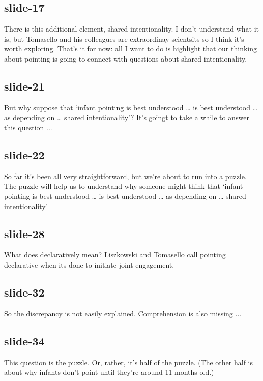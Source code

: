 \documentclass[12pt,\papersize]{extarticle}
\begin{document}
 
\subsection{slide-17}
There is this additional element, shared intentionality. I don't understand what it is, but Tomasello and his colleagues are extraordinay scientsits so I think it's worth exploring.
That's it for now: all I want to do is highlight that our thinking about pointing is going to connect with questions about shared intentionality.
 
 
\subsection{slide-21}
But why suppose that ‘infant pointing is best understood … is best understood … as depending on … shared intentionality’?
It's goingt to take a while to answer this question ...
 
 
\subsection{slide-22}
So far it's been all very straightforward, but we're about to run into a puzzle.
The puzzle will help us to understand why someone might think that ‘infant pointing is best understood … is best understood … as depending on … shared intentionality’
 
 
\subsection{slide-28}
What does declaratively mean? Liszkowski and Tomasello call pointing declarative when its done to initiate joint engagement.
 
 
\subsection{slide-32}
So the discrepancy is not easily explained.
Comprehension is also missing ...
 
 
\subsection{slide-34}
This question is the puzzle. Or, rather, it's half of the puzzle. (The other half is about why infants don't point until they're around 11 months old.)
 
 
\end{document}
